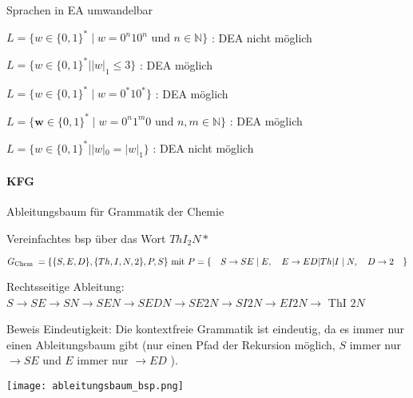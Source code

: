 \begin{example2}{Sprachen in EA umwandelbar}

    $
L=\{w \in\{0,1\}^* \mid w=0^n 10^n \text { und } n \in \mathbb{N}\}
$
: DEA nicht möglich

$
L=\{w \in\{0,1\}^*|| w|_1 \leq 3\}
$
: DEA möglich

$
L=\{w \in\{0,1\}^* \mid w=0^* 10^*\}
$
: DEA möglich

$
L=\{\boldsymbol{w} \in\{0,1\}^* \mid w=0^n 1^m 0 \text { und } n, m \in \mathbb{N}\}
$
: DEA möglich

$
L=\{w \in\{0,1\}^*|| w|_0=|w|_1\}
$
: DEA nicht möglich
\end{example2}

\paragraph{KFG}

\begin{minipage}{0.8\linewidth}
\begin{example2}{Ableitungsbaum für Grammatik der Chemie}

    Vereinfachtes bsp über das Wort $ThI_2N*$

    $G_{\text {Chem }}=\{\{S, E, D\},\{T h, I, N, 2\}, P, S\} \text { mit } P=\{ \\  \quad S \rightarrow S E \mid E, \\  \quad E \rightarrow E D|T h| I \mid N, \\  \quad D \rightarrow 2 \quad \}$

    \vspace{1mm}

    Rechtsseitige Ableitung: $S \rightarrow S E \rightarrow S N \rightarrow S E N \rightarrow S E D N \rightarrow S E 2 N \rightarrow S I 2 N \rightarrow E I 2 N \rightarrow$ ThI $2 N$

    \vspace{1mm}

    Beweis Eindeutigkeit: Die kontextfreie Grammatik ist eindeutig, da es immer nur einen Ableitungsbaum gibt (nur einen Pfad der Rekursion möglich, $S$ immer nur $\rightarrow S E$ und $E$ immer nur $\rightarrow E D$ ).
\end{example2}
\end{minipage}
\begin{minipage}{0.2\linewidth}
    \texttt{[image: ableitungsbaum\_bsp.png]}
\end{minipage}

